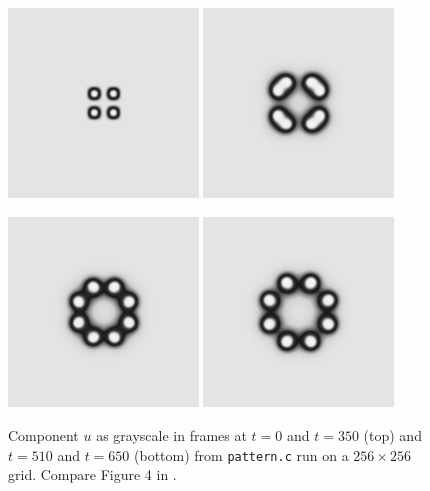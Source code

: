 \begin{figure}
\includegraphics[width=0.45\textwidth]{figs/pattern000} \quad
\includegraphics[width=0.45\textwidth]{figs/pattern350}

\medskip \medskip
\includegraphics[width=0.45\textwidth]{figs/pattern510} \quad
\includegraphics[width=0.45\textwidth]{figs/pattern650}
\caption{Component $u$ as grayscale in frames at $t=0$ and $t=350$ (top) and $t=510$ and $t=650$ (bottom) from \texttt{pattern.c} run on a $256\times 256$ grid.  Compare Figure 4 in \citep{Pearson1993}.}
\label{fig:ts:pattern:pearson}
\end{figure}

